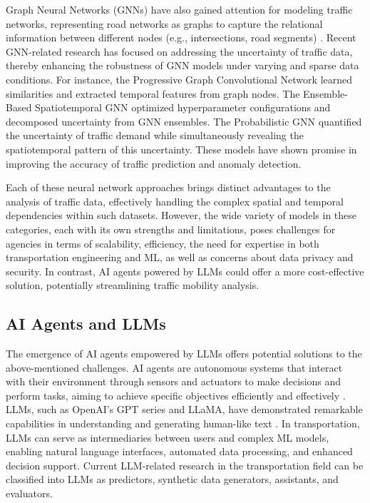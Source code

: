 Graph Neural Networks (GNNs) have also gained attention for modeling traffic networks, representing road networks as graphs to capture the relational information between different nodes (e.g., intersections, road segments) \cite{wu2020connecting}. Recent GNN-related research has focused on addressing the uncertainty of traffic data, thereby enhancing the robustness of GNN models under varying and sparse data conditions. For instance, the Progressive Graph Convolutional Network \cite{shin2024pgcn} learned similarities and extracted temporal features from graph nodes. The Ensemble-Based Spatiotemporal GNN \cite{tanwi2024ensemble} optimized hyperparameter configurations and decomposed uncertainty from GNN ensembles. The Probabilistic GNN \cite{qingyi2024prob} quantified the uncertainty of traffic demand while simultaneously revealing the spatiotemporal pattern of this uncertainty. These models have shown promise in improving the accuracy of traffic prediction and anomaly detection.

Each of these neural network approaches brings distinct advantages to the analysis of traffic data, effectively handling the complex spatial and temporal dependencies within such datasets. However, the wide variety of models in these categories, each with its own strengths and limitations, poses challenges for agencies in terms of scalability, efficiency, the need for expertise in both transportation engineering and ML, as well as concerns about data privacy and security. In contrast, AI agents powered by LLMs could offer a more cost-effective solution, potentially streamlining traffic mobility analysis.

\subsection{AI Agents and LLMs}

The emergence of AI agents empowered by LLMs offers potential solutions to the above-mentioned challenges. AI agents are autonomous systems that interact with their environment through sensors and actuators to make decisions and perform tasks, aiming to achieve specific objectives efficiently and effectively \cite{russell2016artificial}. LLMs, such as OpenAI's GPT series and LLaMA, have demonstrated remarkable capabilities in understanding and generating human-like text \cite{brown2020language}. In transportation, LLMs can serve as intermediaries between users and complex ML models, enabling natural language interfaces, automated data processing, and enhanced decision support. Current LLM-related research in the transportation field can be classified into LLMs as predictors, synthetic data generators, assistants, and evaluators.

